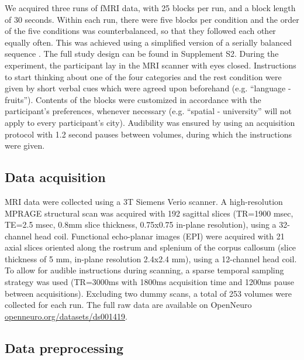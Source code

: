 \documentclass[fleqn,10pt]{SelfArx} %
\begin{document}
We acquired three runs of fMRI data, with 25 blocks per run, and a block length of 30 seconds. Within each run, there were five blocks per condition and the order of the five conditions was counterbalanced, so that they followed each other equally often. This was achieved using a simplified version of a serially balanced sequence \citep{Nair_1967}. The full study design can be found in Supplement S2. 
During the experiment, the participant lay in the MRI scanner with eyes closed. Instructions to start thinking about one of the four categories and the rest condition were given by short verbal cues which were agreed upon beforehand (e.g. “language - fruits”). Contents of the blocks were customized in accordance with the participant's preferences, whenever necessary (e.g. “spatial - university” will not apply to every participant's city). Audibility was ensured by using an acquisition protocol with 1.2 second pauses between volumes, during which the instructions were given.

\subsection{Data acquisition}

MRI data were collected using a 3T Siemens Verio scanner. A high-resolution MPRAGE structural scan was acquired with 192 sagittal slices (TR=1900 msec, TE=2.5 msec, 0.8mm slice thickness, 0.75x0.75 in-plane resolution), using a 32-channel head coil. Functional echo-planar images (EPI) were acquired with 21 axial slices oriented along the rostrum and splenium of the corpus callosum (slice thickness of 5 mm, in-plane resolution 2.4x2.4 mm), using a 12-channel head coil. To allow for audible instructions during scanning, a sparse temporal sampling strategy was used (TR=3000ms with 1800ms acquisition time and 1200ms pause between acquisitions). Excluding two dummy scans, a total of 253 volumes were collected for each run. The full raw data are available on OpenNeuro \href{https://openneuro.org/datasets/ds001419}{openneuro.org/datasets/ds001419}.

\subsection{Data preprocessing}
\end{document}
